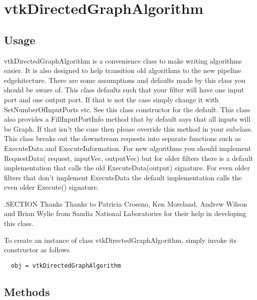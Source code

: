 \section{vtkDirectedGraphAlgorithm}

\subsection{Usage}

 vtkDirectedGraphAlgorithm is a convenience class to make writing algorithms
 easier. It is also designed to help transition old algorithms to the new
 pipeline edgehitecture. There are some assumptions and defaults made by this
 class you should be aware of. This class defaults such that your filter
 will have one input port and one output port. If that is not the case
 simply change it with SetNumberOfInputPorts etc. See this class
 constructor for the default. This class also provides a FillInputPortInfo
 method that by default says that all inputs will be Graph. If that
 isn't the case then please override this method in your subclass. This
 class breaks out the downstream requests into separate functions such as
 ExecuteData and ExecuteInformation.  For new algorithms you should
 implement RequestData( request, inputVec, outputVec) but for older filters
 there is a default implementation that calls the old ExecuteData(output)
 signature. For even older filters that don't implement ExecuteData the
 default implementation calls the even older Execute() signature.

 .SECTION Thanks
 Thanks to Patricia Crossno, Ken Moreland, Andrew Wilson and Brian Wylie from
 Sandia National Laboratories for their help in developing this class.

To create an instance of class vtkDirectedGraphAlgorithm, simply
invoke its constructor as follows
\begin{verbatim}
  obj = vtkDirectedGraphAlgorithm
\end{verbatim}
\subsection{Methods}

